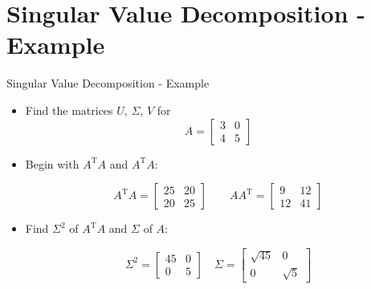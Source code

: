 \section{Singular Value Decomposition - Example}

\begin{frame}[t]{Singular Value Decomposition - Example}
	\begin{itemize}
		\item Find the matrices $U$, $\Sigma$, $V$ for
		\begin{equation*}
			A = 
			\begin{bmatrix}
				3 & 0 \\ 4 & 5
			\end{bmatrix}
		\end{equation*}

        \item Begin with $A^{\text{T}}A$ and $A^{\text{T}}A$:
    
        \begin{equation*}
            A^{\text{T}}A = 
			\begin{bmatrix}
				25 & 20 \\ 20 & 25
			\end{bmatrix}
            \quad \quad
            A A^{\text{T}} = 
			\begin{bmatrix}
				9 & 12 \\ 12 & 41
			\end{bmatrix}
		\end{equation*}

        \item Find $\Sigma^2$ of $A^{\text{T}}A$ and $\Sigma$ of $A$: 

        \begin{equation*}
			\Sigma^2 = 
			\begin{bmatrix}
				45 & 0 \\ 0 & 5
			\end{bmatrix}
        \quad            
			\Sigma = 
			\begin{bmatrix}
                \sqrt{45} & 0 \\ 0 & \sqrt{5}
			\end{bmatrix}
		\end{equation*}


\end{itemize}
\end{frame}

